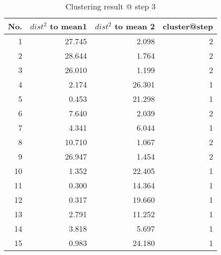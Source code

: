 \begin{table}[htbp]
  \centering
  \caption{Clustering result @ step 3}
    \begin{tabular}{rrrr}
    \toprule
    No.   & $dist^2$ to mean1 & $dist^2$ to mean 2 & cluster@step \\
    \midrule
    1     & 27.745  & 2.098  & 2 \\
    2     & 28.644  & 1.764  & 2 \\
    3     & 26.010  & 1.199  & 2 \\
    4     & 2.174  & 26.301  & 1 \\
    5     & 0.453  & 21.298  & 1 \\
    6     & 7.640  & 2.039  & 2 \\
    7     & 4.341  & 6.044  & 1 \\
    8     & 10.710  & 1.067  & 2 \\
    9     & 26.947  & 1.454  & 2 \\
    10    & 1.352  & 22.405  & 1 \\
    11    & 0.300  & 14.364  & 1 \\
    12    & 0.317  & 19.660  & 1 \\
    13    & 2.791  & 11.252  & 1 \\
    14    & 3.818  & 5.697  & 1 \\
    15    & 0.983  & 24.180  & 1 \\
    \bottomrule
    \end{tabular}%
  \label{tab:cluster_a3}%
\end{table}%

